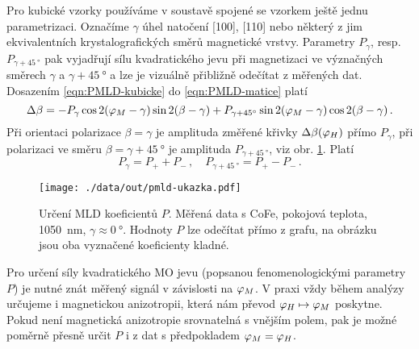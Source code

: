 Pro kubické vzorky používáme v soustavě spojené se vzorkem ještě jednu parametrizaci.
Označíme $\gamma$ úhel natočení [100], [110] nebo některý z jim ekvivalentních krystalografických směrů magnetické vrstvy.
Parametry $P_\gamma$, resp. $P_{\gamma+\SI{45}{\degree}}$ pak vyjadřují sílu kvadratického jevu při magnetizaci ve význačných směrech $\gamma$ a $\gamma+\SI{45}{\degree}$ a lze je vizuálně přibližně odečítat z měřených dat.
Dosazením \eqref{eqn:PMLD-kubicke} do \eqref{eqn:PMLD-matice} platí
\begin{equation}
    \Delta\beta = -P_\gamma \cos 2 (\varphi_M-\gamma) \sin 2(\beta-\gamma) + P_{\gamma+\SI{45}{\degree}} \sin 2 (\varphi_M-\gamma) \cos 2(\beta-\gamma) \,.
\end{equation}
Při orientaci polarizace $\beta=\gamma$ je amplituda změřené křivky $\Delta\beta(\varphi_H)$ přímo $P_{\gamma}$, při polarizaci ve směru $\beta=\gamma+\SI{45}{\degree}$ je amplituda $P_{\gamma+\SI{45}{\degree}}$, viz obr. \ref{fig:urceni-MLD-ilustrace}.
Platí
\begin{equation}
    P_{\gamma} =  P_+ + P_- \,,\quad P_{\gamma+\SI{45}{\degree}} = P_+ - P_- \,.
\end{equation}

\begin{figure}[htbp]
    \centering
    \texttt{[image: ./data/out/pmld-ukazka.pdf]}
    \caption{Určení MLD koeficientů $P$. Měřená data s CoFe, pokojová teplota, \SI{1050}{\nano\meter}, $\gamma\approx\SI{0}{\degree}$. Hodnoty $P$ lze odečítat přímo z grafu, na obrázku jsou oba vyznačené koeficienty kladné.}
    \label{fig:urceni-MLD-ilustrace}
\end{figure}

Pro určení síly kvadratického MO jevu (popsanou fenomenologickými parametry $P$) je nutné znát měřený signál v závislosti na $\varphi_M$.
V praxi vždy během analýzy určujeme i magnetickou anizotropii, která nám převod $\varphi_H \mapsto \varphi_M$ poskytne.
Pokud není magnetická anizotropie srovnatelná s vnějším polem, pak je možné poměrně přesně určit $P$ i z dat s předpokladem $\varphi_M=\varphi_H$.

